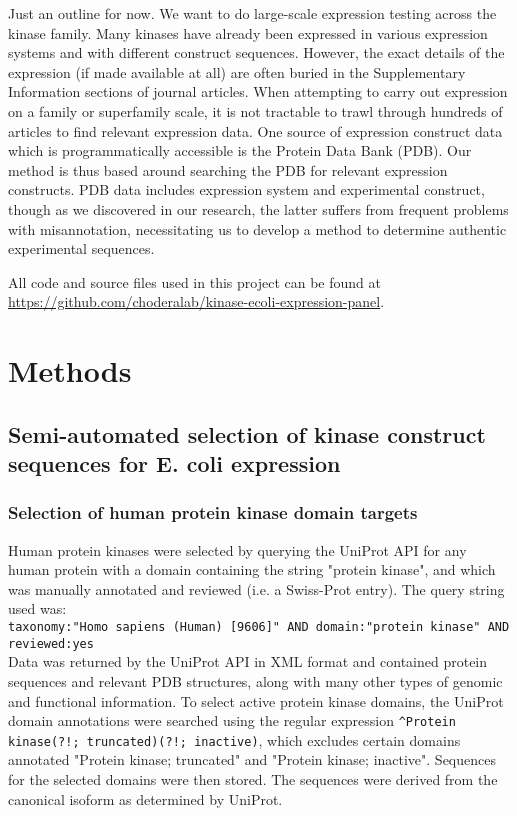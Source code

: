 \documentclass[aps,pre,twocolumn,nofootinbib,superscriptaddress,linenumbers]{revtex4-1}
\begin{document}
{\color{blue} Just an outline for now.}
We want to do large-scale expression testing across the kinase family.
Many kinases have already been expressed in various expression systems and with different construct sequences.
However, the exact details of the expression (if made available at all) are often buried in the Supplementary Information sections of journal articles.
When attempting to carry out expression on a family or superfamily scale, it is not tractable to trawl through hundreds of articles to find relevant expression data.
One source of expression construct data which is programmatically accessible is the Protein Data Bank (PDB).
Our method is thus based around searching the PDB for relevant expression constructs.
PDB data includes expression system and experimental construct, though as we discovered in our research, the latter suffers from frequent problems with misannotation, necessitating us to develop a method to determine authentic experimental sequences.

All code and source files used in this project can be found at \url{https://github.com/choderalab/kinase-ecoli-expression-panel}.

\section{Methods}
\label{section:methods}

\subsection{Semi-automated selection of kinase construct sequences for E. coli expression}

\subsubsection{Selection of human protein kinase domain targets}

Human protein kinases were selected by querying the UniProt API for any human protein with a domain containing the string "protein kinase", and which was manually annotated and reviewed (i.e. a Swiss-Prot entry).
The query string used was:\\
{\tt taxonomy:"Homo sapiens (Human) [9606]" AND domain:"protein kinase" AND reviewed:yes}\\
Data was returned by the UniProt API in XML format and contained protein sequences and relevant PDB structures, along with many other types of genomic and functional information.
To select active protein kinase domains, the UniProt domain annotations were searched using the regular expression {\tt \^{}Protein kinase(?!; truncated)(?!; inactive)}, which excludes certain domains annotated "Protein kinase; truncated" and "Protein kinase; inactive".
Sequences for the selected domains were then stored.
The sequences were derived from the canonical isoform as determined by UniProt.
\end{document}
